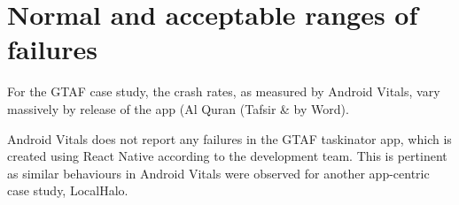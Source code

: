 

\section{Normal and acceptable ranges of failures}
For the GTAF case study, the crash rates, as measured by Android Vitals, vary massively by release of the app (Al Quran (Tafsir \& by Word). 

Android Vitals does not report any failures in the GTAF taskinator app, which is created using React Native according to the development team. This is pertinent as similar behaviours in Android Vitals were observed for another app-centric case study, LocalHalo. 

